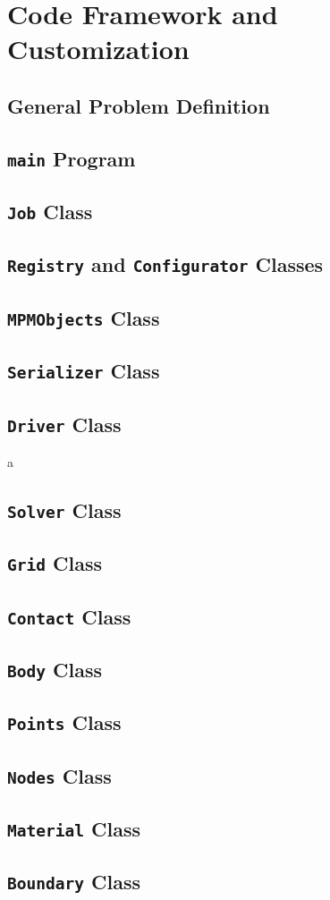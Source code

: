 \chapter{Code Framework and Customization}
\section{General Problem Definition}

\section{\texttt{main} Program}

\section{\texttt{Job} Class}

\section{\texttt{Registry} and \texttt{Configurator} Classes}

\section{\texttt{MPMObjects} Class}

\section{\texttt{Serializer} Class}

\section{\texttt{Driver} Class}
a
\section{\texttt{Solver} Class}

\section{\texttt{Grid} Class}

\section{\texttt{Contact} Class}

\section{\texttt{Body} Class}

\section{\texttt{Points} Class}

\section{\texttt{Nodes} Class}

\section{\texttt{Material} Class}

\section{\texttt{Boundary} Class}